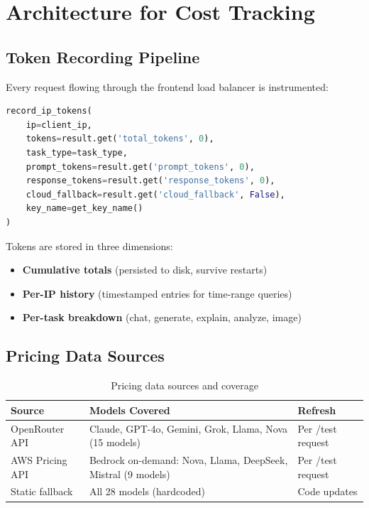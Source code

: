 \documentclass[11pt,a4paper]{article}
\begin{document}
\section{Architecture for Cost Tracking}

\subsection{Token Recording Pipeline}

Every request flowing through the frontend load balancer is instrumented:

\begin{lstlisting}[language=Python,caption={Token recording in proxy\_request}]
record_ip_tokens(
    ip=client_ip,
    tokens=result.get('total_tokens', 0),
    task_type=task_type,
    prompt_tokens=result.get('prompt_tokens', 0),
    response_tokens=result.get('response_tokens', 0),
    cloud_fallback=result.get('cloud_fallback', False),
    key_name=get_key_name()
)
\end{lstlisting}

Tokens are stored in three dimensions:

\begin{itemize}
  \item \textbf{Cumulative totals} (persisted to disk, survive restarts)
  \item \textbf{Per-IP history} (timestamped entries for time-range queries)
  \item \textbf{Per-task breakdown} (chat, generate, explain, analyze, image)
\end{itemize}

\subsection{Pricing Data Sources}

\begin{table}[H]
\centering
\begin{tabularx}{\textwidth}{lXl}
\toprule
\textbf{Source} & \textbf{Models Covered} & \textbf{Refresh} \\
\midrule
OpenRouter API & Claude, GPT-4o, Gemini, Grok, Llama, Nova (15 models) & Per /test request \\
AWS Pricing API & Bedrock on-demand: Nova, Llama, DeepSeek, Mistral (9 models) & Per /test request \\
Static fallback & All 28 models (hardcoded) & Code updates \\
\bottomrule
\end{tabularx}
\caption{Pricing data sources and coverage}
\end{table}
\end{document}
